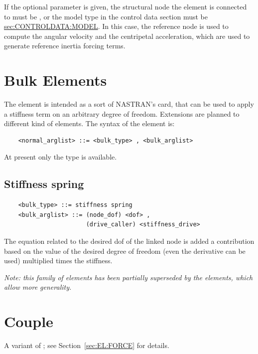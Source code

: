 If the optional  parameter is given, the structural
node the element is connected to must be ,
or the model type in the control data section must be
\hyperref{\kw{static}}{\kw{static} (see Section~}{)}{sec:CONTROLDATA:MODEL}.
In this case, the reference node is used to compute the angular velocity
and the centripetal acceleration, which are used to generate reference
inertia forcing terms.


\section{Bulk Elements}
The  element is intended as a sort of NASTRAN's  card,
that can be used to apply a stiffness term on an arbitrary degree of freedom.
Extensions are planned to different kind of elements.
The syntax of the  element is:
\begin{verbatim}
    <normal_arglist> ::= <bulk_type> , <bulk_arglist>
\end{verbatim}
At present only the  type is available.

\subsection{Stiffness spring}
\begin{verbatim}
    <bulk_type> ::= stiffness spring
    <bulk_arglist> ::= (node_dof) <dof> ,
                       (drive_caller) <stiffness_drive>
\end{verbatim}
The equation related to the desired dof of the linked node is added a
contribution based on the value of the desired degree of freedom (even the
derivative can be used) multiplied times the stiffness.

{\em Note: this family of elements has been partially superseded by the
 elements, which allow more generality.}




\section{Couple}
A variant of ; see Section~\ref{sec:EL:FORCE} for details.




